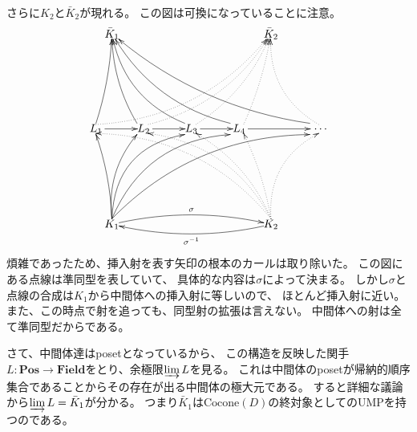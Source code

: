 \documentclass[a4j]{jarticle}
\begin{document}
    さらに$K_2$と$\bar{K}_2$が現れる。
    この図は可換になっていることに注意。
    \[
    \begin{xy}
        (00, 30)    *{L_1}="L1",
        (15, 30)    *{L_2}="L2",
        (30, 30)    *{L_3}="L3",
        (45, 30)    *{L_4}="L4",
        (70, 30)    *{~\dots}="Li",
        (5, 60)     *{\bar{K}_1}="cK1",
        (5, 00)     *{K_1}="K1",
        (55, 60)    *{\bar{K}_2}="cK2",
        (55, 00)    *{K_2}="K2",

        \ar@{->}            "L1"+<0.8em,0em>;"L2"
        \ar@{->}            "L2"+<0.8em,0em>;"L3"
        \ar@{->}            "L3"+<0.8em,0em>;"L4"
        \ar@{->}            "L4"+<0.8em,0em>;"Li"

        \ar@{->}@/_1mm/ "K1"+<0.0em,0.5em>;"L1"+<-0.0em,-0.5em>
        \ar@{->}@/^3mm/ "K1"+<0.0em,0.5em>;"L2"+<-0.6em,-0.5em>
        \ar@{->}@/^7mm/ "K1"+<0.0em,0.5em>;"L3"+<-0.6em,-0.5em>
        \ar@{->}@/^7mm/ "K1"+<0.0em,0.5em>;"L4"+<-0.8em,-0.5em>
        \ar@{->}@/^7mm/ "K1"+<0.0em,0.5em>;"Li"+<-0.8em,-0.5em>
        \ar@{->}@/_1mm/ "L1"+<-0.0em,0.5em>;"cK1"
        \ar@{->}@/^2mm/ "L2"+<-0.6em,0.5em>;"cK1"
        \ar@{->}@/^5mm/ "L3"+<-0.6em,0.5em>;"cK1"
        \ar@{->}@/^5mm/ "L4"+<-0.8em,0.5em>;"cK1"
        \ar@{->}@/^5mm/ "Li"+<-0.8em,0.5em>;"cK1"

        \ar@{.>}@/_7mm/ "K2"+<0.0em,0.5em>;"L1"+<0.0em,-0.4em>
        \ar@{.>}@/_6mm/ "K2"+<0.0em,0.5em>;"L2"+<0.4em,-0.4em>
        \ar@{.>}@/_3mm/ "K2"+<0.0em,0.5em>;"L3"+<0.4em,-0.4em>
        \ar@{.>}@/_1mm/ "K2"+<0.0em,0.5em>;"L4"+<0.4em,-0.4em>
        \ar@{.>}@/^5mm/ "K2"+<0.0em,0.5em>;"Li"+<0.0em,-0.4em>
        \ar@{.>}@/_7mm/ "L1"+<0.0em,0.4em>;"cK2"
        \ar@{.>}@/_5mm/ "L2"+<0.4em,0.4em>;"cK2"
        \ar@{.>}@/_3mm/ "L3"+<0.4em,0.4em>;"cK2"
        \ar@{.>}@/_1mm/ "L4"+<0.4em,0.4em>;"cK2"
        \ar@{.>}@/^5mm/ "Li"+<0.0em,0.4em>;"cK2"

        \ar@{->}@/^3mm/^{\sigma} "K1";"K2"
        \ar@{->}@/^3mm/^{\sigma^{-1}} "K2";"K1"
    \end{xy}
    \]
    煩雑であったため、挿入射を表す矢印の根本のカールは取り除いた。
    この図にある点線は準同型を表していて、
    具体的な内容は$\sigma$によって決まる。
    しかし$\sigma$と点線の合成は$K_1$から中間体への挿入射に等しいので、
    ほとんど挿入射に近い。
    また、この時点で射を追っても、同型射の拡張は言えない。
    中間体への射は全て準同型だからである。

    さて、中間体達はposetとなっているから、
    この構造を反映した関手$L:\mathbf{Pos} \to \mathbf{Field}$をとり、余極限$\varinjlim L$を見る。
    これは中間体のposetが帰納的順序集合であることからその存在が出る中間体の極大元である。
    すると詳細な議論から$\varinjlim L=\bar{K}_1$が分かる。
    つまり$\bar{K}_1$は$\mathrm{Cocone}(D)$の終対象としてのUMPを持つのである。
\end{document}
